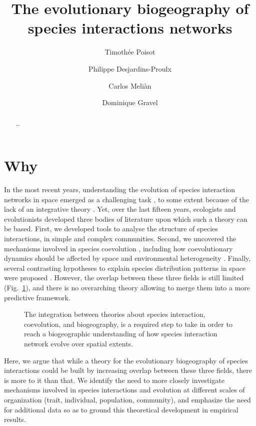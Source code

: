 \documentclass[11pt,oneside]{article}
\title{The evolutionary biogeography of species interactions networks}
\author{Timoth\'ee Poisot \and Philippe Desjardins-Proulx \and Carlos Meli\`an \and Dominique Gravel}
\begin{document}
\maketitle
\begin{abstract}
	\ldots 
\end{abstract}
\onehalfspacing\clearpage


\section{Why}
In the most recent years, understanding the evolution of species interaction
networks in space emerged as a challenging task \parencite{Pillai2011}, to some
extent because of the lack of an integrative theory \parencite{Urban2008}. Yet,
over the last fifteen years, ecologists and evolutionists developed three bodies
of literature upon which such a theory can be based. First, we developed tools
to analyse the structure of species interactions, in simple and complex
communities. Second, we uncovered the mechanisms involved in species coevolution
\parencite{Thompson1994a}, including how coevolutionary dynamics should be
affected by space and environmental heterogeneity \parencite{Thompson2005}.
Finally, several contrasting hypotheses to explain species distribution
patterns in space were proposed \parencite{O'Dwyer2010}. However, the overlap
between these three fields is still limited (Fig.~\ref{f:venn}), and there is
no overarching theory allowing to merge them into a more predictive framework.

\begin{figure}[htbp]
   \centering
   
   \caption{The integration between theories about species interaction,
   coevolution, and biogeography, is a required step to take in order to reach
   a biogeographic understanding of how species interaction network evolve
   over spatial extents.}
   \label{f:venn}
\end{figure}

Here, we argue that while a theory for the evolutionary biogeography of
species interactions could be built by increasing overlap between these three
fields, there is more to it than that. We identify the need to more closely
investigate mechanisms involved in species interactions and evolution at
different scales of organization (trait, individual, population, community),
and emphasize the need for additional data so as to ground this theoretical
development in empirical results.
\end{document}
